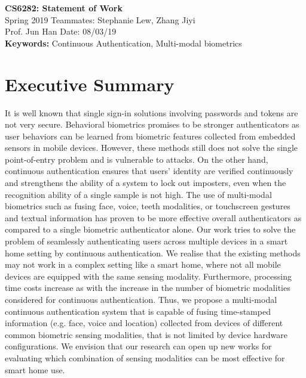 \documentclass[a4paper, 11pt]{article}
\begin{document}
\noindent
\large\textbf{CS6282: Statement of Work} \hfill  \\
\normalsize Spring 2019 \hfill Teammates: Stephanie Lew, Zhang Jiyi \\
Prof. Jun Han \hfill  Date: 08/03/19 \\

{\bf Keywords:} Continuous Authentication, Multi-modal biometrics
\section*{Executive Summary}
It is well known that single sign-in solutions involving passwords and tokens are not very secure. Behavioral biometrics promises to be stronger authenticators as user behaviors can be learned from biometric features collected from embedded sensors in mobile devices. However, these methods still does not solve the single point-of-entry problem and is vulnerable to attacks. On the other hand, continuous authentication ensures that users’ identity are verified continuously and strengthens the ability of a system to lock out imposters, even when the recognition ability of a single sample is not high. The use of multi-modal biometrics such as fusing face, voice, teeth modalities, or touchscreen gestures and textual information has proven to be more effective overall authenticators as compared to a single biometric authenticator alone. Our work  tries to solve the problem of seamlessly authenticating users across multiple devices in a smart home setting by continuous authentication. We realise that the existing methods may not work in a complex setting like a smart home, where not all mobile devices are equipped with the same sensing modality. Furthermore, processing time costs increase as with the increase in the number of biometric modalities considered for continuous authentication. Thus, we propose a multi-modal continuous authentication system that is capable of fusing time-stamped information (e.g. face, voice and location) collected from devices of different common biometric sensing modalities, that is not limited by device hardware configurations. We envision that our research can open up new works for evaluating which combination of sensing modalities can be most effective for smart home use. 
\end{document}
